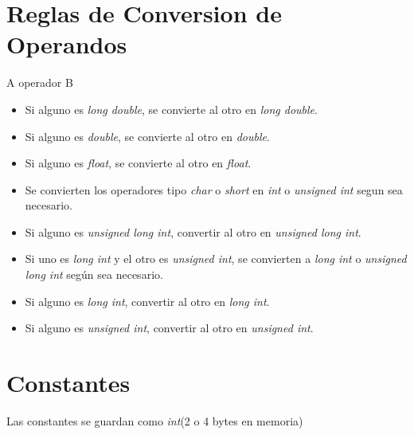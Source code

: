 \documentclass{article}
\begin{document}
\newpage
\section{Reglas de Conversion de Operandos}
\begin{minipage}[c]{.45\textwidth}
    A operador B
\end{minipage}
\begin{itemize}
    \item Si alguno es \emph{long double}, se convierte al otro en \emph{long double}.
    \item Si alguno es \emph{double}, se convierte al otro en \emph{double}.
    \item Si alguno es \emph{float}, se convierte al otro en \emph{float}.
    \item Se convierten los operadores tipo \emph{char} o \emph{short} en \emph{int} o \emph{unsigned int} segun sea necesario.
    \item Si alguno es \emph{unsigned long int}, convertir al otro en \emph{unsigned long int}.
    \item Si uno es \emph{long int} y el otro es \emph{unsigned int}, se convierten a \emph{long int} o \emph{unsigned long int} según sea necesario.
    \item Si alguno es \emph{long int}, convertir al otro en \emph{long int}.
    \item Si alguno es \emph{unsigned int}, convertir al otro en \emph{unsigned int}.
\end{itemize}

\newpage
\section{Constantes}
Las constantes se guardan como \emph{int}(2 o 4 bytes en memoria)
\end{document}
